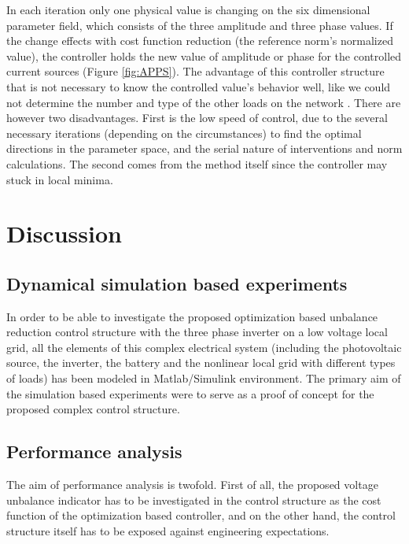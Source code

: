         In each iteration only one physical value is changing on the six dimensional parameter field, which consists of the three amplitude and three phase values. If the change effects with cost function reduction (the reference norm's normalized value), the controller holds the new value of amplitude or phase for the controlled current sources (Figure \ref{fig:APPS}). The advantage of this controller structure that is not necessary to know the controlled value's behavior well, like we could not determine the number and type of the other loads on the network \cite{Neukirchner2015}. There are however two disadvantages. First is the low speed of control, due to the several necessary iterations (depending on the circumstances) to find the optimal directions in the parameter space, and the serial nature of interventions and norm calculations. The second comes from the method itself since the controller may stuck in local minima.

\section{Discussion}\label{VUB:sec:Discussion}


    \subsection{Dynamical simulation based experiments}\label{VUB:sec:Results}
		
    In order to be able to investigate the proposed optimization based unbalance reduction control structure with the three phase inverter on a low voltage local grid, all the elements of this complex electrical system (including the photovoltaic source, the inverter, the battery and the nonlinear local grid with different types of loads) has been modeled in Matlab/Simulink environment. The primary aim of the simulation based experiments were to serve as a proof of concept for the proposed complex control structure.

    \subsection{Performance analysis}\label{VUB:sec:Performance}

    The aim of performance analysis is twofold. First of all, the proposed voltage unbalance indicator has to be investigated in the control structure as the cost function of the optimization based controller, and on the other hand, the control structure itself has to be exposed against engineering expectations.


